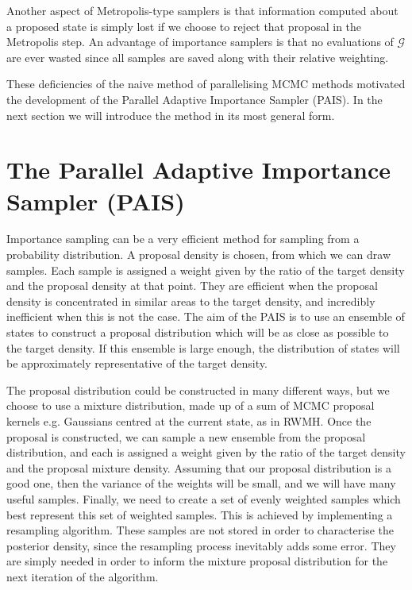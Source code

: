 \documentclass[final]{siamltex}
\begin{document}
Another aspect of Metropolis-type samplers is that information
computed about a proposed state is simply lost if we choose to reject
that proposal in the Metropolis step. An advantage of importance
samplers is that no evaluations of $\mathcal{G}$ are ever wasted
since all samples are saved along with their relative weighting.

These deficiencies of the naive method of parallelising MCMC methods
motivated the development of the Parallel Adaptive Importance Sampler
(PAIS). In the next section we will introduce the method in its most
general form.


\section{The Parallel Adaptive Importance Sampler \allowbreak (PAIS)}\label{Sec:PAIS}

Importance sampling can be a very efficient method for sampling from a
probability distribution. A proposal density is chosen, from which we
can draw samples. Each sample is assigned a weight given by the
ratio of the target density and the proposal density at that
point. They are efficient when the proposal density is concentrated in
similar areas to the target density, and incredibly inefficient when
this is not the case. The aim of the PAIS is to use an ensemble of states to construct a proposal
distribution which will be as close as possible to the target density. If this
ensemble is large enough, the distribution of states will be
approximately representative
of the target density.

The proposal distribution could be constructed in many different ways,
but we choose to use a mixture distribution, made up of a sum of MCMC
proposal kernels  e.g. Gaussians centred at the current state, as in RWMH. Once the proposal is constructed, we can
sample a new ensemble from the proposal distribution, and each is
assigned a weight given by the ratio of the target density and the
proposal mixture density. Assuming that our proposal distribution is a
good one, then the variance of the weights will be small, and we will
have many useful samples. Finally, we need to create a set of evenly
weighted samples which best represent this set of weighted samples.
This is achieved by implementing a resampling algorithm. These samples
are not stored in order to characterise the posterior density, since
the resampling process inevitably adds some error. They are
simply needed in order to inform the mixture proposal distribution for the next
iteration of the algorithm. 
\end{document}
